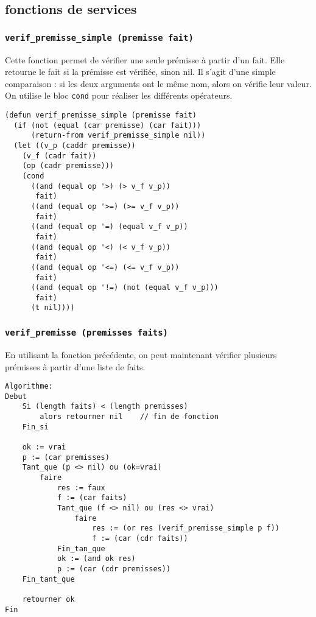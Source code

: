 \documentclass[a4paper, 12pt, final]{article}
\begin{document}
\subsection{fonctions de services}
\subsubsection{\texttt{verif\_premisse\_simple (premisse fait)}}
Cette fonction permet de vérifier une seule prémisse à partir d'un fait. Elle retourne le fait si la prémisse est vérifiée, sinon nil. Il s'agit d'une simple comparaison : si les deux arguments ont le même nom, alors on vérifie leur valeur. On utilise le bloc \texttt{cond} pour réaliser les différents opérateurs.

\begin{verbatim}
(defun verif_premisse_simple (premisse fait)
  (if (not (equal (car premisse) (car fait)))
      (return-from verif_premisse_simple nil))
  (let ((v_p (caddr premisse)) 
    (v_f (cadr fait))
    (op (cadr premisse)))
    (cond 
      ((and (equal op '>) (> v_f v_p))
       fait)
      ((and (equal op '>=) (>= v_f v_p))
       fait)
      ((and (equal op '=) (equal v_f v_p))
       fait)
      ((and (equal op '<) (< v_f v_p))
       fait)
      ((and (equal op '<=) (<= v_f v_p))
       fait)
      ((and (equal op '!=) (not (equal v_f v_p)))
       fait)
      (t nil))))
\end{verbatim}

\subsubsection{\texttt{verif\_premisse (premisses faits)}}
En utilisant la fonction précédente, on peut maintenant vérifier plusieurs prémisses à partir d'une liste de faits.

\begin{verbatim}
Algorithme:
Debut
    Si (length faits) < (length premisses)
        alors retourner nil    // fin de fonction
    Fin_si 
    
    ok := vrai
    p := (car premisses)
    Tant_que (p <> nil) ou (ok=vrai)
        faire
            res := faux
            f := (car faits)
            Tant_que (f <> nil) ou (res <> vrai)
                faire
                    res := (or res (verif_premisse_simple p f))
                    f := (car (cdr faits))
            Fin_tan_que
            ok := (and ok res)
            p := (car (cdr premisses))
    Fin_tant_que
    
    retourner ok
Fin
\end{verbatim}
\end{document}

